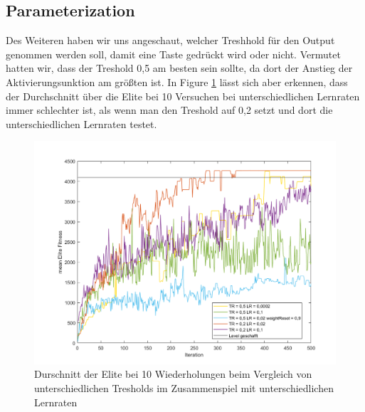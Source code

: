 \documentclass{hbrs-ecta-report}
\begin{document}
\subsection{Parameterization}

Des Weiteren haben wir uns angeschaut,  welcher Treshhold für den Output genommen werden soll, damit eine Taste gedrückt wird oder nicht. Vermutet hatten wir, dass der Treshold 0,5 am besten sein sollte, da dort der Anstieg der Aktivierungsunktion am größten ist. In Figure \ref{fig:treshold} lässt sich aber erkennen, dass der Durchschnitt über die Elite bei 10 Versuchen bei unterschiedlichen Lernraten immer schlechter ist, als wenn man den Treshold auf 0,2 setzt und dort die unterschiedlichen Lernraten testet. 
\begin{figure}[ht!]
	\centering
	\includegraphics[width=\linewidth]{img/Mario_Treshold.png}
	\caption{Durschnitt der Elite bei 10 Wiederholungen beim Vergleich von unterschiedlichen Tresholds im Zusammenspiel mit unterschiedlichen Lernraten}
	\label{fig:treshold} 
\end{figure}
\end{document}
